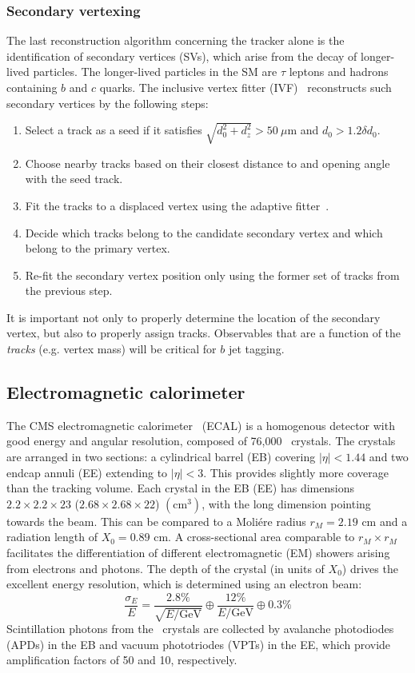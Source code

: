 \subsubsection{Secondary vertexing}

The last reconstruction algorithm concerning the tracker alone is the identification of secondary vertices (SVs), which arise from the decay of longer-lived particles.
The longer-lived particles in the SM are $\tau$ leptons and hadrons containing $b$ and $c$ quarks.
The inclusive vertex fitter (IVF)~\cite{csvv2} reconstructs such secondary vertices by the following steps:
\begin{enumerate}
    \item Select a track as a seed if it satisfies $\sqrt{d_0^2 + d_z^2} > 50~\mu\mathrm{m}$ and $d_0 > 1.2 \delta d_0$.
    \item Choose nearby tracks based on their closest distance to and opening angle with the seed track.
    \item Fit the tracks to a displaced vertex using the adaptive fitter~\cite{adaptivefit}.
    \item Decide which tracks belong to the candidate secondary vertex and which belong to the primary vertex.
    \item Re-fit the secondary vertex position only using the former set of tracks from the previous step.
\end{enumerate}
It is important not only to properly determine the location of the secondary vertex, but also to properly assign tracks.
Observables that are a function of the \emph{tracks} (e.g. vertex mass) will be critical for $b$ jet tagging.

\subsection{Electromagnetic calorimeter}

The CMS electromagnetic calorimeter~\cite{cmsecaljinst} (ECAL) is a homogenous detector with good energy and angular resolution, composed of 76,000 \pbwo~crystals. 
The crystals are arranged in two sections: a cylindrical barrel (EB) covering $|\eta|<1.44$ and two endcap annuli (EE) extending to $|\eta|<3$.
This provides slightly more coverage than the tracking volume.
Each crystal in the EB (EE) has dimensions $2.2\times2.2\times23$ ($2.68\times2.68\times22$) $(\mathrm{cm}^3)$, with the long dimension pointing towards the beam.
This can be compared to a Moli\'ere radius $r_M=2.19$ cm and a radiation length of $X_0=0.89$ cm. 
A cross-sectional area comparable to $r_M\times r_M$ facilitates the differentiation of different electromagnetic (EM) showers arising from electrons and photons.
The depth of the crystal (in units of $X_0$) drives the excellent energy resolution, which is determined using an electron beam:
\begin{equation}
    \frac{\sigma_E}{E} = \frac{2.8\%}{\sqrt{E/\mathrm{GeV}}} \oplus \frac{12\%}{E/\mathrm{GeV}} \oplus 0.3\%
\end{equation}
Scintillation photons from the \pbwo~crystals are collected by avalanche photodiodes (APDs) in the EB and vacuum phototriodes (VPTs) in the EE, which provide amplification factors of 50 and 10, respectively. 

